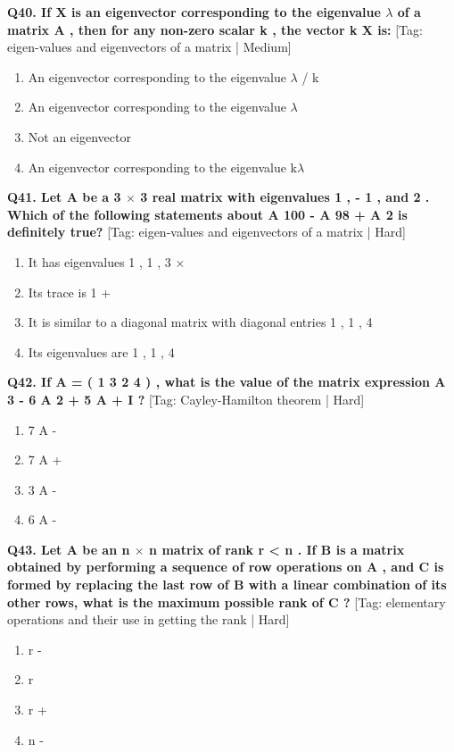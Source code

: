 \noindent\textbf{Q40. If X is an eigenvector corresponding to the eigenvalue $\lambda$ of a matrix A , then for any non-zero scalar k , the vector k X is:} \hfill [Tag: eigen-values and eigenvectors of a matrix | Medium]
\begin{enumerate}[label=(\alph*),topsep=2pt,itemsep=1pt,partopsep=0pt,parsep=0pt]
    \item {{An eigenvector corresponding to the eigenvalue $\lambda$ / k}}
    \item {{An eigenvector corresponding to the eigenvalue $\lambda$}}
    \item {{Not an eigenvector}}
    \item {{An eigenvector corresponding to the eigenvalue k$\lambda$}}
\end{enumerate}
\vspace{2mm}

\noindent\textbf{Q41. Let A be a 3 $\times$ 3 real matrix with eigenvalues 1 , - 1 , and 2 . Which of the following statements about A 100 - A 98 + A 2 is definitely true?} \hfill [Tag: eigen-values and eigenvectors of a matrix | Hard]
\begin{enumerate}[label=(\alph*),topsep=2pt,itemsep=1pt,partopsep=0pt,parsep=0pt]
    \item {{It has eigenvalues 1 , 1 , 3 $\times$}}
    \item {{Its trace is 1 +}}
    \item {{It is similar to a diagonal matrix with diagonal entries 1 , 1 , 4}}
    \item {{Its eigenvalues are 1 , 1 , 4}}
\end{enumerate}
\vspace{2mm}

\noindent\textbf{Q42. If A = ( 1 3 2 4 ) , what is the value of the matrix expression A 3 - 6 A 2 + 5 A + I ?} \hfill [Tag: Cayley-Hamilton theorem | Hard]
\begin{enumerate}[label=(\alph*),topsep=2pt,itemsep=1pt,partopsep=0pt,parsep=0pt]
    \item {{7 A -}}
    \item {{7 A +}}
    \item {{3 A -}}
    \item {{6 A -}}
\end{enumerate}
\vspace{2mm}

\noindent\textbf{Q43. Let A be an n $\times$ n matrix of rank r < n . If B is a matrix obtained by performing a sequence of row operations on A , and C is formed by replacing the last row of B with a linear combination of its other rows, what is the maximum possible rank of C ?} \hfill [Tag: elementary operations and their use in getting the rank | Hard]
\begin{enumerate}[label=(\alph*),topsep=2pt,itemsep=1pt,partopsep=0pt,parsep=0pt]
    \item {{r -}}
    \item {{r}}
    \item {{r +}}
    \item {{n -}}
\end{enumerate}
\vspace{2mm}

